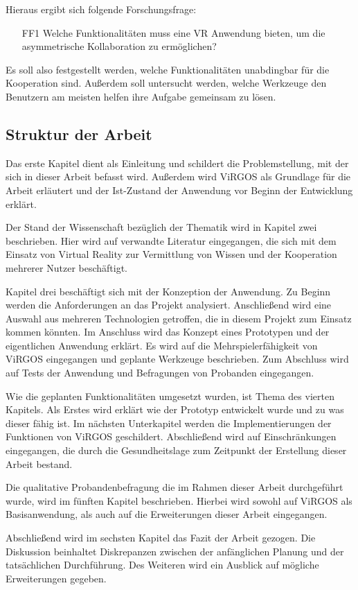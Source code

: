 Hieraus ergibt sich folgende Forschungsfrage:

\begin{itemize}
\item[FF1] \label{FF1} Welche Funktionalitäten muss eine VR Anwendung bieten, um die asymmetrische Kollaboration zu ermöglichen?
\end{itemize}

Es soll also festgestellt werden, welche Funktionalitäten unabdingbar für die Kooperation sind. Außerdem soll untersucht werden, welche Werkzeuge den Benutzern am meisten helfen ihre Aufgabe gemeinsam zu lösen.


\subsection{Struktur der Arbeit}
Das erste Kapitel dient als Einleitung und schildert die Problemstellung, mit der sich in dieser Arbeit befasst wird. Außerdem wird ViRGOS als Grundlage für die Arbeit erläutert und der Ist-Zustand der Anwendung vor Beginn der Entwicklung erklärt. \newline

Der Stand der Wissenschaft bezüglich der Thematik wird in Kapitel zwei beschrieben. Hier wird auf verwandte Literatur eingegangen, die sich mit dem Einsatz von Virtual Reality zur Vermittlung von Wissen und der Kooperation mehrerer Nutzer beschäftigt. \newline

Kapitel drei beschäftigt sich mit der Konzeption der Anwendung. Zu Beginn werden die Anforderungen an das Projekt analysiert. Anschließend wird eine Auswahl aus mehreren Technologien getroffen, die in diesem Projekt zum Einsatz kommen könnten. Im Anschluss wird das Konzept eines Prototypen und der eigentlichen Anwendung erklärt. Es wird auf die Mehrspielerfähigkeit von ViRGOS eingegangen und geplante Werkzeuge beschrieben. Zum Abschluss wird auf Tests der Anwendung und Befragungen von Probanden eingegangen. \newline

Wie die geplanten Funktionalitäten umgesetzt wurden, ist Thema des vierten Kapitels. Als Erstes wird erklärt wie der Prototyp entwickelt wurde und zu was dieser fähig ist. Im nächsten Unterkapitel werden die Implementierungen der Funktionen von ViRGOS geschildert. Abschließend wird auf Einschränkungen eingegangen, die durch die Gesundheitslage zum Zeitpunkt der Erstellung dieser Arbeit bestand. \newline

Die qualitative Probandenbefragung die im Rahmen dieser Arbeit durchgeführt wurde, wird im fünften Kapitel beschrieben. Hierbei wird sowohl auf ViRGOS als Basisanwendung, als auch auf die Erweiterungen dieser Arbeit eingegangen. \newline

Abschließend wird im sechsten Kapitel das Fazit der Arbeit gezogen. Die Diskussion beinhaltet Diskrepanzen zwischen der anfänglichen Planung und der tatsächlichen Durchführung. Des Weiteren wird ein Ausblick auf mögliche Erweiterungen gegeben.
